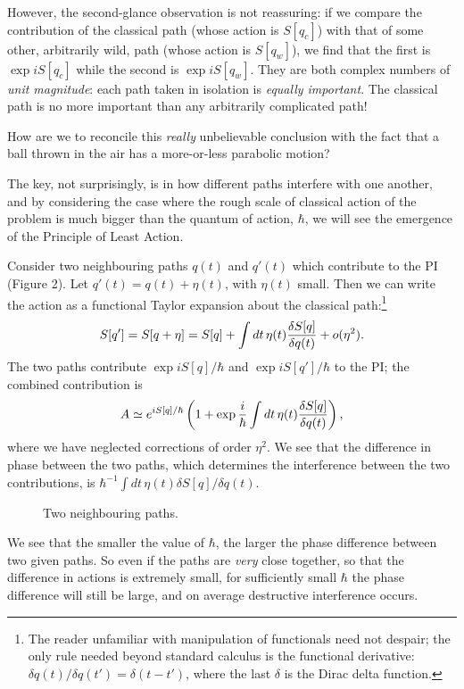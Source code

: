 \documentclass[12pt]{article}
\begin{document}
However, the second-glance observation is not reassuring: if we
compare the contribution of the classical path (whose action is
$S[q_c]$) with that of some other, arbitrarily wild, path (whose
action is $S[q_w]$), we find that the first is $\exp iS[q_c]$ while
the second is $\exp iS[q_w]$. They are both complex numbers of {\em
unit magnitude}: each path taken in isolation is {\em equally
important}. The classical path is no more important than any
arbitrarily complicated path!

How are we to reconcile this {\em really} unbelievable conclusion with
the fact that a ball thrown in the air has a more-or-less parabolic
motion?

The key, not surprisingly, is in how different paths interfere with
one another, and by considering the case where the rough scale of
classical action of the problem is much bigger than the quantum of
action, $\hbar$, we will see the emergence of the Principle of Least
Action.

Consider two neighbouring paths $q(t)$ and $q'(t)$
which contribute to the PI
(Figure 2). Let $q'(t)=q(t)+\eta(t)$, with $\eta(t)$ small. Then we
can write the action as a functional Taylor expansion about the
classical path:\footnote{The reader unfamiliar with manipulation of
  functionals need not despair; the only rule needed beyond
  standard calculus is the functional derivative: $\delta q(t)/\delta
  q(t')=\delta(t-t')$, where the last $\delta$ is the Dirac delta
  function.}
\[ S[q']=S[q+\eta]=S[q]+\int dt\,\eta(t){\delta S[q]\over\delta q(t)}
+o(\eta^2). \]
The two paths contribute $\exp iS[q]/\hbar$ and $\exp iS[q']/\hbar$ to
the PI; the combined contribution is
\[ 
A\simeq e^{iS[q]/\hbar}\left(1+\exp {i\over\hbar}
\int dt\,\eta(t){\delta S[q]\over\delta q(t)}\right),
\]
where we have neglected corrections of order $\eta^2$. We see that the
difference in phase between the two paths, which determines the
interference between the two contributions, is 
$\hbar^{-1}\int dt\,\eta(t)\delta S[q]/\delta q(t)$.
\begin{figure}[ht]
\epsfysize=5cm
\centerline{}
\caption{Two neighbouring paths.}
\end{figure}

We see that the smaller the value of $\hbar$, the larger the phase
difference between two given paths. So even if the paths are {\em very}
close together, so that the difference in actions is extremely small,
for sufficiently small $\hbar$ the phase difference will still be
large, and on average destructive interference occurs.
\end{document}
